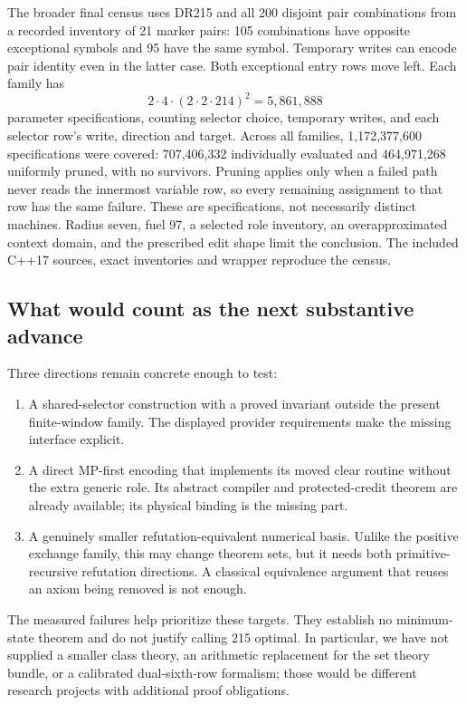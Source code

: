 \documentclass[11pt,a4paper]{article}
\theoremstyle{definition}
\numberwithin{equation}{section}
\begin{document}
The broader final census uses DR215 and all 200 disjoint pair combinations
from a recorded inventory of 21 marker pairs: 105 combinations have
opposite exceptional symbols and 95 have the same symbol. Temporary
writes can encode pair identity even in the latter case. Both exceptional
entry rows move left. Each family has
\[
 2\cdot4\cdot(2\cdot2\cdot214)^2=5{,}861{,}888
\]
parameter specifications, counting selector choice, temporary writes, and
each selector row's write, direction and target. Across all families,
1,172,377,600 specifications were covered: 707,406,332 individually
evaluated and 464,971,268 uniformly pruned, with no survivors. Pruning
applies only when a failed path never reads the innermost variable row,
so every remaining assignment to that row has the same failure. These
are specifications, not necessarily distinct machines. Radius seven,
fuel 97, a selected role inventory, an overapproximated context domain,
and the prescribed edit shape limit the conclusion. The included C++17
sources, exact inventories and wrapper reproduce the census.

\subsection{What would count as the next substantive advance}

Three directions remain concrete enough to test:
\begin{enumerate}
\item A shared-selector construction with a proved invariant outside the
present finite-window family. The displayed provider requirements make
the missing interface explicit.
\item A direct MP-first encoding that implements its moved clear routine
without the extra generic role. Its abstract compiler and protected-credit
theorem are already available; its physical binding is the missing part.
\item A genuinely smaller refutation-equivalent numerical basis. Unlike
the positive exchange family, this may change theorem sets, but it needs
both primitive-recursive refutation directions. A classical equivalence
argument that reuses an axiom being removed is not enough.
\end{enumerate}

The measured failures help prioritize these targets. They establish no
minimum-state theorem and do not justify calling 215 optimal. In
particular, we have not supplied a smaller class theory, an arithmetic
replacement for the set theory bundle, or a calibrated dual-sixth-row
formalism; those would be different research projects with additional
proof obligations.
\end{document}

